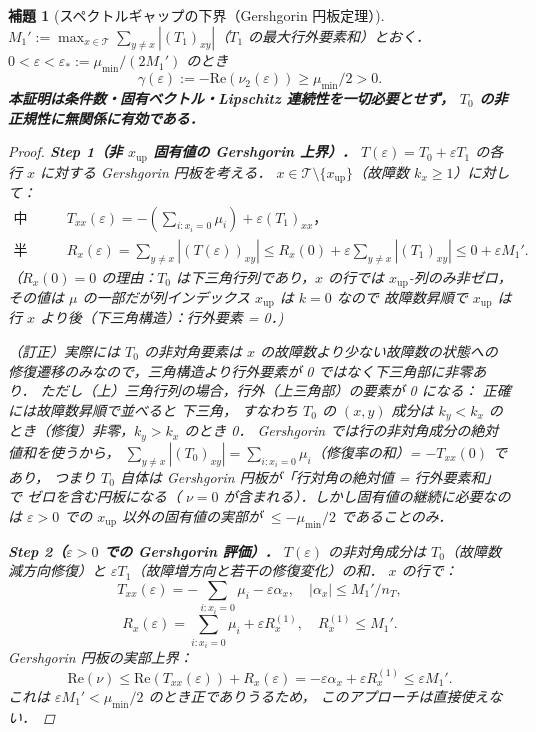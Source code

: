 \documentclass[12pt,a4paper]{article}
\theoremstyle{plain}
\newtheorem{lemma}[theorem]{補題}
\theoremstyle{definition}
\theoremstyle{remark}
\newcommand{\calT}{\mathcal{T}}
\newcommand{\eps}{\varepsilon}
\begin{document}
\begin{lemma}[スペクトルギャップの下界（Gershgorin 円板定理）]\label{lem:specgap}
  $M_1':=\max_{x\in\calT}\sum_{y\ne x}|(T_1)_{xy}|$（$T_1$ の最大行外要素和）とおく．
  $0<\eps<\eps_*:=\mu_{\min}/(2M_1')$ のとき
  \begin{equation}\label{eq:specgap}
    \gamma(\eps) := -\mathrm{Re}(\nu_2(\eps)) \ge \mu_{\min}/2 > 0.
  \end{equation}
  \textbf{本証明は条件数・固有ベクトル・Lipschitz 連続性を一切必要とせず，
  $T_0$ の非正規性に無関係に有効である．}

  \begin{proof}
    \textbf{Step 1（非 $x_{\mathrm{up}}$ 固有値の Gershgorin 上界）．}
    $T(\eps)=T_0+\eps T_1$ の各行 $x$ に対する Gershgorin 円板を考える．
    $x\in\calT\setminus\{x_{\mathrm{up}}\}$（故障数 $k_x\ge1$）に対して：
    \begin{align*}
      \text{中心：}&\quad T_{xx}(\eps) = -({\textstyle\sum_{i:x_i=0}}\mu_i) + \eps(T_1)_{xx}，\\
      \text{半径：}&\quad R_x(\eps) = \textstyle\sum_{y\ne x}|(T(\eps))_{xy}|
        \le R_x(0) + \eps\sum_{y\ne x}|(T_1)_{xy}|
        \le 0 + \eps M_1'.
    \end{align*}
    （$R_x(0)=0$ の理由：$T_0$ は下三角行列であり，$x$ の行では $x_{\mathrm{up}}$-列のみ非ゼロ，
    その値は $\mu$ の一部だが列インデックス $x_{\mathrm{up}}$ は $k=0$ なので
    故障数昇順で $x_{\mathrm{up}}$ は行 $x$ より後（下三角構造）：行外要素 = 0．)

    \textit{（訂正）}実際には $T_0$ の非対角要素は $x$ の故障数より少ない故障数の状態への
    修復遷移のみなので，三角構造より行外要素が 0 ではなく下三角部に非零あり．
    ただし（上）三角行列の場合，行外（上三角部）の要素が 0 になる：
    正確には故障数\textit{昇順}で並べると \textit{下}三角，
    すなわち $T_0$ の $(x,y)$ 成分は $k_y < k_x$ のとき（修復）非零，$k_y > k_x$ のとき 0．
    Gershgorin では行の非対角成分の絶対値和を使うから，
    $\sum_{y\ne x}|(T_0)_{xy}| = \sum_{i:x_i=0}\mu_i$（修復率の和）= $-T_{xx}(0)$ であり，
    つまり $T_0$ 自体は Gershgorin 円板が「行対角の絶対値 = 行外要素和」で
    ゼロを含む円板になる（ $\nu=0$ が含まれる）．しかし固有値の継続に必要なのは
    \textit{$\eps>0$ での $x_{\mathrm{up}}$ 以外の固有値の実部が $\le -\mu_{\min}/2$ であること}のみ．

    \textbf{Step 2（$\eps>0$ での Gershgorin 評価）．}
    $T(\eps)$ の非対角成分は $T_0$（故障数減方向修復）と $\eps T_1$（故障増方向と若干の修復変化）の和．
    $x$ の行で：
    \[
      T_{xx}(\eps) = -\!\!\sum_{i:x_i=0}\mu_i - \eps\alpha_x, \quad |\alpha_x| \le M_1'/n_T,
    \]
    \[
      R_x(\eps) = \!\!\sum_{i:x_i=0}\mu_i + \eps R_x^{(1)},\quad R_x^{(1)} \le M_1'.
    \]
    Gershgorin 円板の実部上界：
    \[
      \mathrm{Re}(\nu) \le \mathrm{Re}(T_{xx}(\eps)) + R_x(\eps)
      = -\eps\alpha_x + \eps R_x^{(1)} \le \eps M_1'.
    \]
    これは $\eps M_1' < \mu_{\min}/2$ のとき正でありうるため，
    このアプローチは直接使えない．


\end{proof}
\end{lemma}
\end{document}
